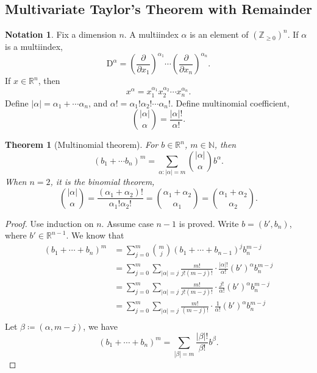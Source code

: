 \documentclass[12pt]{article}
\theoremstyle{plain}
\newtheorem{thm}{Theorem}
\theoremstyle{definition}
\newtheorem*{notation}{Notation}
\begin{document}
\subsection*{Multivariate Taylor's Theorem with Remainder}
\begin{notation}
    Fix a dimension $n$.
    A multiindex $\alpha$ is an element of $(\mathbb{Z}_{\geq0})^n$.
    If $\alpha$ is a multiindex, 
    \[
        \mathrm{D}^\alpha = \left(\frac{\partial}{\partial x_1}\right)^{\alpha_1}\cdots\left(\frac{\partial}{\partial x_n}\right)^{\alpha_n}.
    \]
    If $x\in \mathbb{R}^n$,  then
    \[
        x^\alpha = x_1^{\alpha_1} x_2^{\alpha_2} \cdots x_n^{\alpha_n}.
    \]
    Define $|\alpha| = \alpha_1 + \cdots \alpha_n$, and $\alpha! = \alpha_1!\alpha_2!\cdots\alpha_n! $.
    Define multinomial coefficient,
    \[
        \binom{|\alpha|}{\alpha} = \frac{|\alpha|!}{\alpha!}.
    \]
\end{notation}
\begin{thm}[Multinomial theorem]
    For $b\in\mathbb{R}^n$, $m\in\mathbb{N}$, then
    \[
        (b_1+\cdots b_n)^m = \sum_{\alpha:|\alpha| = m} \binom{|\alpha|}{\alpha} b^\alpha.
    \]
    When $n=2$, it is the binomial theorem,
    \[
        \binom{|\alpha|}{\alpha} = \frac{(\alpha_1+\alpha_2)!}{\alpha_1!\alpha_2!} = \binom{\alpha_1+\alpha_2}{\alpha_1} = \binom{\alpha_1+\alpha_2}{\alpha_2}.
    \]
\end{thm}
\begin{proof}
    Use induction on $n$.
    Assume case $n-1$ is proved.
    Write $b=(b',b_n)$, where $b'\in\mathbb{R}^{n-1}$.
    We know that
    \[\begin{aligned}
            (b_1+\cdots+b_n)^m &= \sum_{j=0}^m \binom{m}{j}(b_1+\cdots +b_{n-1})^j b_n^{m-j}\\
                               &=\sum_{j=0}^m \sum_{|\alpha|=j} \frac{m!}{j!(m-j)!}\cdot\frac{|\alpha|!}{\alpha!}(b')^\alpha b_n^{m-j}\\
                               &=\sum_{j=0}^m \sum_{|\alpha|=j} \frac{m!}{j!(m-j)!}\cdot\frac{j!}{\alpha!}(b')^\alpha b_n^{m-j}\\
                               &=\sum_{j=0}^m \sum_{|\alpha|=j} \frac{m!}{(m-j)!}\cdot\frac{1}{\alpha!}(b')^\alpha b_n^{m-j}\\
    \end{aligned}\]
    Let $\beta\coloneqq (\alpha, m-j)$, we have
    \[
        (b_1+\cdots+b_n)^m =\sum_{|\beta|=m}\frac{|\beta|!}{\beta!}b^\beta.
    \]
\end{proof}
\end{document}
